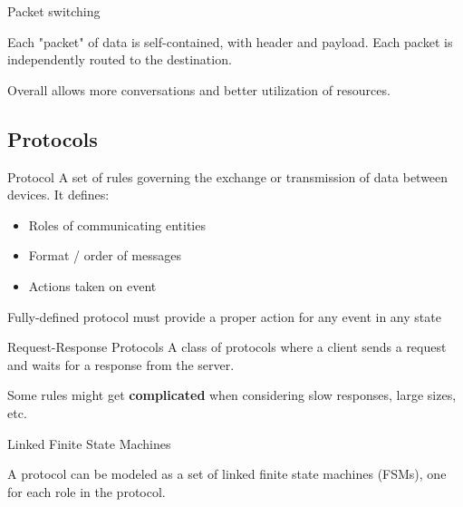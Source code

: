 \begin{definition}
    {Packet switching}

    Each "packet" of data is self-contained, with header and payload. Each packet is independently routed to the destination.

    Overall allows more conversations and better utilization of resources.
\end{definition}

\subsection{Protocols}

\begin{definition}
    {Protocol}
    A set of rules governing the exchange or transmission of data between devices. It defines:
    \begin{itemize}
        \item Roles of communicating entities
        \item Format / order of messages
        \item Actions taken on event
    \end{itemize}
    Fully-defined protocol must provide a proper action for any event in any state
\end{definition}

\begin{theorem}
    {Request-Response Protocols}
    A class of protocols where a client sends a request and waits for a response from the server.

    Some rules might get \textbf{complicated} when considering slow responses, large sizes, etc.
\end{theorem}

\begin{knBox}
    {Linked Finite State Machines}

    A protocol can be modeled as a set of linked finite state machines (FSMs), one for each role in the protocol.
\end{knBox}

